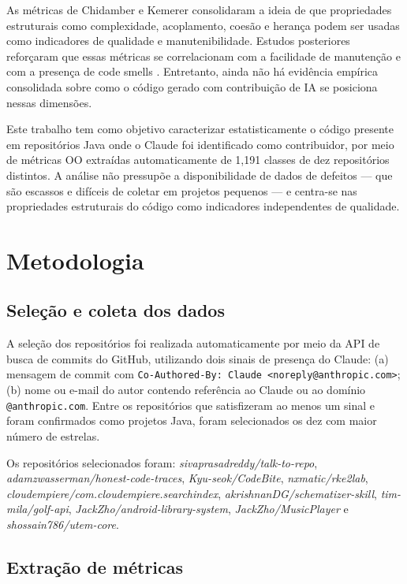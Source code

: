 \documentclass[12pt]{article}
\begin{document}
As métricas de Chidamber e Kemerer \cite{ck1994} consolidaram a ideia de que propriedades estruturais como complexidade, acoplamento, coesão e herança podem ser usadas como indicadores de qualidade e manutenibilidade. Estudos posteriores reforçaram que essas métricas se correlacionam com a facilidade de manutenção e com a presença de code smells \cite{basili1996,fowler1999}. Entretanto, ainda não há evidência empírica consolidada sobre como o código gerado com contribuição de IA se posiciona nessas dimensões.

Este trabalho tem como objetivo caracterizar estatisticamente o código presente em repositórios Java onde o Claude foi identificado como contribuidor, por meio de métricas OO extraídas automaticamente de 1{,}191 classes de dez repositórios distintos. A análise não pressupõe a disponibilidade de dados de defeitos — que são escassos e difíceis de coletar em projetos pequenos — e centra-se nas propriedades estruturais do código como indicadores independentes de qualidade.

\section{Metodologia}

\subsection{Seleção e coleta dos dados}

A seleção dos repositórios foi realizada automaticamente por meio da API de busca de commits do GitHub, utilizando dois sinais de presença do Claude: (a) mensagem de commit com \texttt{Co-Authored-By: Claude <noreply@anthropic.com>}; (b) nome ou e-mail do autor contendo referência ao Claude ou ao domínio \texttt{@anthropic.com}. Entre os repositórios que satisfizeram ao menos um sinal e foram confirmados como projetos Java, foram selecionados os dez com maior número de estrelas.

Os repositórios selecionados foram: \textit{sivaprasadreddy/talk-to-repo}, \textit{adamzwasserman/honest-code-traces}, \textit{Kyu-seok/CodeBite}, \textit{nxmatic/rke2lab}, \textit{cloudempiere/com.cloudempiere.searchindex}, \textit{akrishnanDG/schematizer-skill}, \textit{tim-mila/golf-api}, \textit{JackZho/android-library-system}, \textit{JackZho/MusicPlayer} e \textit{shossain786/utem-core}.

\subsection{Extração de métricas}
\end{document}
